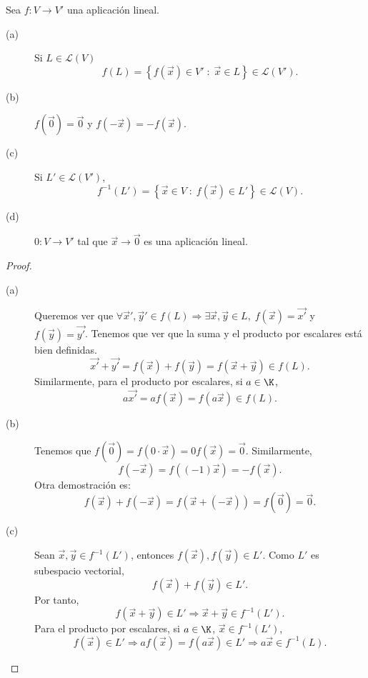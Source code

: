 \begin{fprop}[]
\normalfont Sea $\displaystyle f : V \to V' $ una aplicación lineal. 
\begin{description}
\item[(a)] Si $\displaystyle L \in \mathcal{L}\left(V\right) $
	\[f\left(L\right) = \left\{ f\left(\vec{x}\right)\in V' \; : \; \vec{x} \in L\right\} \in \mathcal{L}\left(V'\right) .\]
\item[(b)] $\displaystyle f\left(\vec{0}\right) = \vec{0} $ y $\displaystyle f\left(-\vec{x}\right)=-f\left(\vec{x}\right) $.
\item[(c)] Si $\displaystyle L' \in \mathcal{L}\left(V'\right) $,
	\[f^{-1}\left(L'\right) = \left\{ \vec{x} \in V \; : \; f\left(\vec{x}\right) \in L'\right\} \in \mathcal{L}\left(V\right) .\]
\item[(d)] $\displaystyle 0 : V \to V' $ tal que $\displaystyle \vec{x} \to \vec{0} $ es una aplicación lineal.
\end{description}
\end{fprop}

\begin{proof}
\begin{description}
\item[(a)] Queremos ver que $\displaystyle \forall \vec{x}', \vec{y}' \in f\left(L\right) \Rightarrow \exists\vec{x}, \vec{y} \in L, \; f\left(\vec{x}\right) = \vec{x'}$ y $\displaystyle f\left(\vec{y}\right) = \vec{y'} $. Tenemos que ver que la suma y el producto por escalares está bien definidas.  
	\[\vec{x'} + \vec{y'} = f\left(\vec{x}\right) + f\left(\vec{y}\right) = f\left(\vec{x} + \vec{y}\right) \in f\left(L\right) .\]
Similarmente, para el producto por escalares, si $\displaystyle a \in \K $,
\[a \vec{x'} = af\left(\vec{x}\right) = f\left(a\vec{x}\right) \in f\left(L\right).\]
\item[(b)] Tenemos que $\displaystyle f\left(\vec{0}\right) = f\left(0 \cdot \vec{x}\right) = 0 f\left(\vec{x}\right) = \vec{0} $. Similarmente, 
	\[f\left(-\vec{x}\right) =  f\left(\left(-1\right)\vec{x}\right) = - f\left(\vec{x}\right) .\]
Otra demostración es:
\[f\left(\vec{x}\right) + f\left(-\vec{x}\right) = f\left(\vec{x} + \left(-\vec{x}\right)\right) = f\left(\vec{0}\right) = \vec{0} .\]
\item[(c)] Sean $\displaystyle \vec{x}, \vec{y} \in f^{-1}\left(L'\right) $, entonces $\displaystyle f\left(\vec{x}\right), f\left(\vec{y}\right) \in L' $. Como $\displaystyle L' $ es subespacio vectorial, 
	\[f\left(\vec{x}\right) + f\left(\vec{y}\right) \in L' .\]
Por tanto, 
\[f\left(\vec{x} + \vec{y}\right) \in L' \Rightarrow \vec{x} + \vec{y} \in f^{-1}\left(L'\right) .\]
Para el producto por escalares, si $\displaystyle a\in\K $, $\displaystyle \vec{x} \in f^{-1}\left(L'\right) $, 
\[f\left(\vec{x}\right)\in L' \Rightarrow a f\left(\vec{x}\right) = f\left(a\vec{x}\right) \in L' \Rightarrow a\vec{x} \in f^{-1}\left(L\right) .\]
\end{description}
\end{proof}

